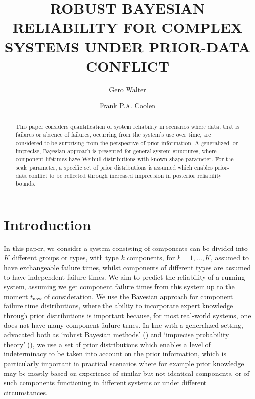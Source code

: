 \documentclass[Journal,letterpaper]{ascelike-new}
\def\tnow{t_\text{now}}
\begin{document}
\title{ROBUST BAYESIAN RELIABILITY FOR COMPLEX SYSTEMS UNDER PRIOR-DATA CONFLICT}

\author[1]{Gero Walter}
\author[2]{Frank P.A. Coolen}


\maketitle

\begin{abstract}
This paper considers quantification of system reliability in scenarios
where data, that is failures or absence of failures, occurring from the 
system's use over time, are considered to be 
surprising from the perspective of prior information.
A generalized, or imprecise, Bayesian approach is presented for general
system structures, where component lifetimes have Weibull distributions with
known shape parameter. For the scale parameter, a specific set of prior distributions
is assumed which enables prior-data conflict to be reflected through increased
imprecision in posterior reliability bounds.


\end{abstract}



\section{Introduction}
\label{sec:intro}
%

In this paper, we consider a system consisting of components can be divided into $K$ different groups
or types, with type $k$ components, for $k=1, \ldots, K$, assumed to have exchangeable failure
times, whilst components of different types are assumed to have independent failure times. 
We aim to predict the reliability of a running system, assuming we get component failure times 
from this system up to the moment $\tnow$ of consideration. We use the Bayesian approach for
component failure time distributions, where the ability to incorporate expert knowledge through
prior distributions is important because, for most real-world systems, one does not have 
many component failure times. In line with a generalized setting, advocated both as `robust Bayesian methods'
() and `imprecise probability theory' (),
we use a set of prior distributions which enables a level of indeterminacy to be taken into account on
the prior information, which is particularly important in practical scenarios where for example prior
knowledge may be mostly based on experience of similar but not identical components, or of such components
functioning in different systems or under different circumstances. 
\end{document}
